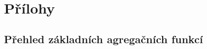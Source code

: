 \documentclass[12pt,a4paper]{report}
\begin{document}



\tableofcontents















\listoffigures

\listoftables


\ifx\ThesisType\TypePhD
{}
\fi

\appendix
\chapter{Přílohy}

\section{Přehled základních agregačních funkcí}
\end{document}
